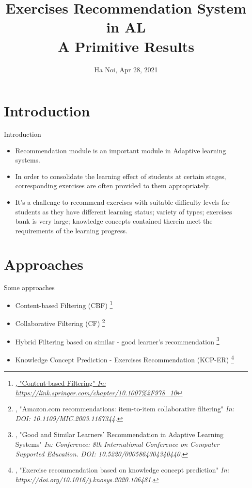 \documentclass[10pt,a4paper,openany]{beamer}
\author[phucpx]{}
\title{Exercises Recommendation System in AL \\ A Primitive Results}
\institute[]{}
\date{Ha Noi, Apr 28, 2021}
\begin{document}
	\listoffigures

	\begin{frame}
		\titlepage
	\end{frame}
	
	\section{Introduction}
	\begin{frame}{Introduction}
		\begin{itemize}
			\item Recommendation module is an important module in Adaptive learning systems.
			\item In order to consolidate the learning effect of students at certain stages, corresponding exercises are often provided to them appropriately. 
			\item It’s a challenge to recommend exercises with suitable difficulty levels for students as they have different learning status; variety of types; exercises bank is very large; knowledge concepts contained therein meet the requirements of the learning progress. 
		\end{itemize}
	\end{frame}
	
	
	\section{Approaches}
	\begin{frame}{Some approaches}
		\begin{itemize}
			\item Content-based Filtering (CBF) \footnote{\href{https://link.springer.com/chapter/10.1007\%2F978\-3\-540\-72079\-9\_10}{, "Content-based Filtering" \emph{\href{https://link.springer.com/chapter/10.1007\%2F978\-3\-540\-72079\-9\_10}{\color{blue} In: https://link.springer.com/chapter/10.1007\%2F978\_10}}}}
			
			\item Collaborative Filtering (CF) \footnote{, "Amazon.com recommendations: item-to-item collaborative filtering" \emph{\color{blue} In: DOI: 10.1109/MIC.2003.1167344.}}  
			
			\item Hybrid Filtering based on similar - good learner's recommendation \footnote{, "Good and Similar Learners' Recommendation  in Adaptive Learning Systems" \emph{\color{blue} In: Conference: 8th International Conference on Computer Supported Education. DOI: 10.5220/0005864304340440.}}
			
			\item Knowledge Concept Prediction - Exercises Recommendation (KCP-ER) \footnote{, "Exercise recommendation based on knowledge concept prediction" \emph{\color{blue} In: https://doi.org/10.1016/j.knosys.2020.106481.}}
		\end{itemize}
	\end{frame}
	
\end{document}
